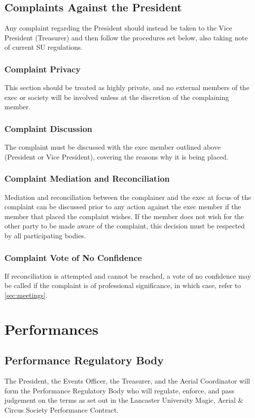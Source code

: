 \documentclass[11pt,a4paper]{article}
\begin{document}
\subsection{Complaints Against the President}
Any complaint regarding the President should instead be taken to the Vice President (Treasurer) and then follow the procedures set below, also taking note of current SU regulations.

\subsubsection{Complaint Privacy}
This section should be treated as highly private, and no external members of the exec or society will be involved unless at the discretion of the complaining member.

\subsubsection{Complaint Discussion}
The complaint must be discussed with the exec member outlined above (President or Vice President), covering the reasons why it is being placed.

\subsubsection{Complaint Mediation and Reconciliation}
Mediation and reconciliation between the complainer and the exec at focus of the complaint can be discussed prior to any action against the exec member if the member that placed the complaint wishes. If the member does not wish for the other party to be made aware of the complaint, this decision must be respected by all participating bodies.

\subsubsection{Complaint Vote of No Confidence}
If reconciliation is attempted and cannot be reached, a vote of no confidence may be called if the complaint is of professional significance, in which case, refer to \autoref{sec:meetings}.

\section{Performances}\label{sec:performances}
\subsection{Performance Regulatory Body}
The President, the Events Officer, the Treasurer, and the Aerial Coordinator will form the Performance Regulatory Body who will regulate, enforce, and pass judgement on the terms as set out in the Lancaster University Magic, Aerial \& Circus Society Performance Contract.
\end{document}
